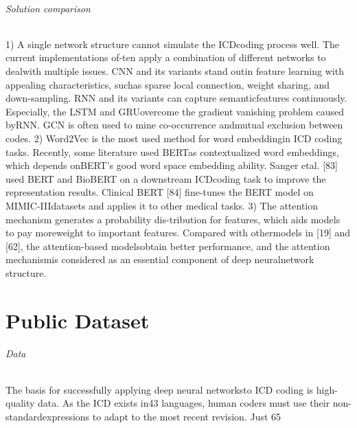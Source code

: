 \paragraph{Solution comparison}
1) A  single  network  structure  cannot  simulate  the  ICDcoding  process  well.  The  current  implementations  of-ten  apply  a  combination  of  different  networks  to  dealwith  multiple  issues.  CNN  and  its  variants  stand  outin feature learning with appealing characteristics, suchas  sparse  local  connection,  weight  sharing,  and  down-sampling.  RNN  and  its  variants  can  capture  semanticfeatures  continuously.  Especially,  the  LSTM  and  GRUovercome  the  gradient  vanishing  problem  caused  byRNN.  GCN  is  often  used  to  mine  co-occurrence  andmutual  exclusion  between  codes. 
2) Word2Vec is the most used method for word embeddingin ICD coding tasks. Recently, some literature used BERTas contextualized word embeddings, which depends onBERT’s  good  word  space  embedding  ability.  Sanger  etal. [83] used BERT and BioBERT on a downstream ICDcoding task to improve the representation results. Clinical BERT [84] fine-tunes the BERT model on MIMIC-IIIdatasets and applies it to other medical tasks.
3) The  attention  mechanism  generates  a  probability  dis-tribution  for  features,  which  aids  models  to  pay  moreweight  to  important  features.  Compared  with  othermodels  in  [19]  and  [62],  the  attention-based  modelsobtain better performance, and the attention mechanismis considered as an essential component of deep neuralnetwork structure.

\part{Public Dataset}
\paragraph{Data}
The  basis  for  successfully  applying  deep  neural  networksto  ICD  coding  is  high-quality  data.  As  the  ICD  exists  in43  languages,  human  coders  must  use  their  non-standardexpressions to adapt to the most recent revision. Just 65%

